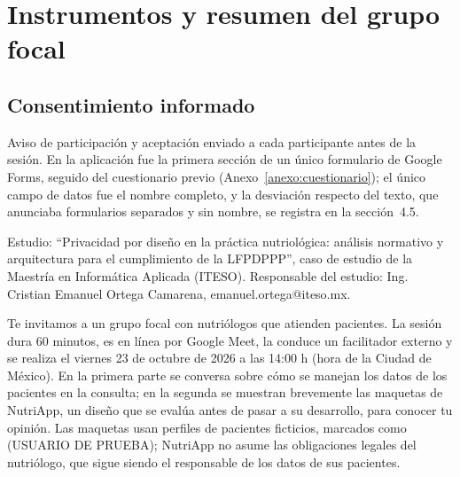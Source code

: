 \documentclass[12pt, a4paper]{article}
\makeatletter
\newcommand{\saltoseccion}{\par
  \ifx\@deferlist\@empty
    \ifdim\pagegoal<\maxdimen
      \ifdim\dimexpr\textheight-\pagegoal+\pagetotal\relax>0.5\textheight\clearpage\fi
    \fi
  \else\clearpage\fi}
\let\seccionbase\section
\renewcommand{\section}{\saltoseccion\seccionbase}
\makeatother
\begin{document}
%
%
%
%
%
\appendix
\section{Instrumentos y resumen del grupo focal}
\label{anexo:grupo-focal}

\subsection{Consentimiento informado}
\label{anexo:consentimiento}
 
Aviso de participación y aceptación enviado a cada participante antes de la sesión. En la aplicación fue la primera sección de un único formulario de Google Forms, seguido del cuestionario previo (Anexo~\ref{anexo:cuestionario}); el único campo de datos fue el nombre completo, y la desviación respecto del texto, que anunciaba formularios separados y sin nombre, se registra en la sección~4.5.
 
Estudio: ``Privacidad por diseño en la práctica nutriológica: análisis normativo y arquitectura para el cumplimiento de la LFPDPPP'', caso de estudio de la Maestría en Informática Aplicada (ITESO). Responsable del estudio: Ing. Cristian Emanuel Ortega Camarena, emanuel.ortega@iteso.mx.
 
Te invitamos a un grupo focal con nutriólogos que atienden pacientes. La sesión dura 60 minutos, es en línea por Google Meet, la conduce un facilitador externo y se realiza el viernes 23 de octubre de 2026 a las 14:00 h (hora de la Ciudad de México). En la primera parte se conversa sobre cómo se manejan los datos de los pacientes en la consulta; en la segunda se muestran brevemente las maquetas de NutriApp, un diseño que se evalúa antes de pasar a su desarrollo, para conocer tu opinión. Las maquetas usan perfiles de pacientes ficticios, marcados como (USUARIO DE PRUEBA); NutriApp no asume las obligaciones legales del nutriólogo, que sigue siendo el responsable de los datos de sus pacientes.
 
\end{document}
